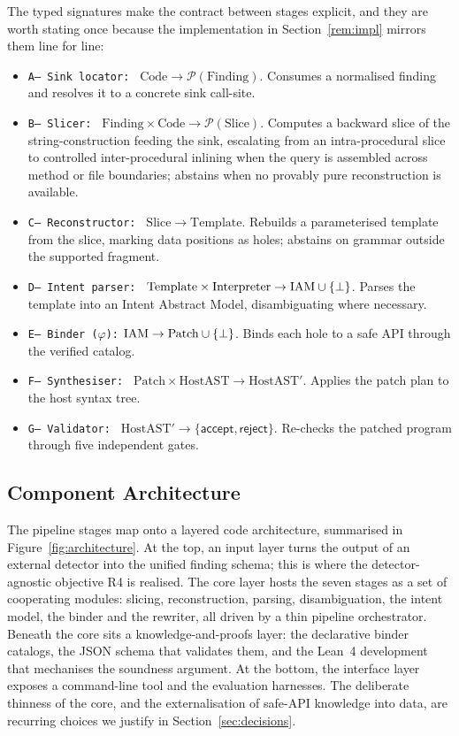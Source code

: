 The typed signatures make the contract between stages explicit, and they are
worth stating once because the implementation in Section~\ref{rem:impl}
mirrors them line for line:
\begin{itemize}%
  \item \texttt{A-- Sink locator: } $\mathrm{Code}\to\mathcal{P}(\mathrm{Finding})$.
  Consumes a normalised finding and resolves it to a concrete sink call-site.
  \item \texttt{B-- Slicer: }
  $\mathrm{Finding}\times\mathrm{Code}\to\mathcal{P}(\mathrm{Slice})$.
  Computes a backward slice of the string-construction feeding the sink,
  escalating from an intra-procedural slice to controlled inter-procedural
  inlining when the query is assembled across method or file boundaries;
  abstains when no provably pure reconstruction is available.
  \item \texttt{C-- Reconstructor: } $\mathrm{Slice}\to\mathrm{Template}$. Rebuilds
  a parameterised template from the slice, marking data positions as holes;
  abstains on grammar outside the supported fragment.
  \item \texttt{D-- Intent parser: }
  $\mathrm{Template}\times\mathrm{Interpreter}\to\mathrm{IAM}\cup\{\bot\}$.
  Parses the template into an Intent Abstract Model, disambiguating where
  necessary.
  \item \texttt{E-- Binder ($\varphi$):}
  $\mathrm{IAM}\to\mathrm{Patch}\cup\{\bot\}$. Binds each hole to a safe
  API through the verified catalog.
  \item \texttt{F-- Synthesiser: }
  $\mathrm{Patch}\times\mathrm{HostAST}\to\mathrm{HostAST}'$. Applies the
  patch plan to the host syntax tree.
  \item \texttt{G-- Validator: }
  $\mathrm{HostAST}'\to\{\textsf{accept},\textsf{reject}\}$. Re-checks the
  patched program through five independent gates.
\end{itemize}

\subsection{Component Architecture}
\label{sec:components}

The pipeline stages map onto a layered code architecture, summarised in
Figure~\ref{fig:architecture}. At the top, an input layer turns the output
of an external detector into the unified finding schema; this is where the
detector-agnostic objective R4 is realised. The core layer hosts the seven
stages as a set of cooperating modules: slicing, reconstruction, parsing,
disambiguation, the intent model, the binder and the rewriter, all driven by
a thin pipeline orchestrator. Beneath the core sits a knowledge-and-proofs
layer: the declarative binder catalogs, the JSON schema that validates them,
and the Lean~4 development that mechanises the soundness argument. At the
bottom, the interface layer exposes a command-line tool and the evaluation
harnesses. The deliberate thinness of the core, and the externalisation of
safe-API knowledge into data, are recurring choices we justify in
Section~\ref{sec:decisions}.

